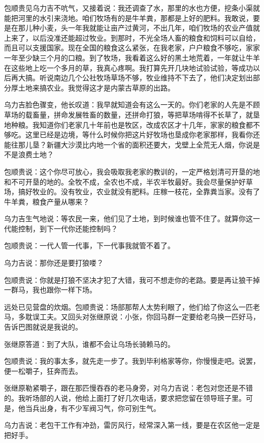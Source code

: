 \par 包顺贵见乌力吉不吭气，又接着说：我还调查了水，那里的水也方便，挖条小渠就能把河里的水引来浇地。咱们牧场有的是牛羊粪，那都是上好的肥料。我敢说，要是在那儿种小麦，头一年我就能让亩产过黄河，不出几年，咱们牧场的农业产值就上来了，以后没准还能超过牧业。到那时，不光全场人畜的粮食和饲料可以自给，而且可以支援国家。现在全国的粮食这么紧张，在我老家，户户粮食不够吃，家家一年至少缺三个月的口粮。到了牧场，我看着这么好的黑土地荒着，一年就让牛羊在这些地上吃一个多月的草，我真心疼啊。我打算先开几块地试验试验，等成功以后再大搞。听说南边几个公社牧场草场不够，牧业维持不下去了，他们决定划出部分厚土地来搞农业。我觉得这才是内蒙古草原的出路。
\par 乌力吉脸色骤变，他长叹道：我早就知道会有这么一天的。你们老家的人先是不顾草场的载畜量，拼命发展牲畜的数量，还拼命打狼，等把草场啃得不长草了，就垦地种粮。我知道你们老家几十年前也是牧区，改成农区才十几年，家家的粮食都不够吃。这里已经是边境，等什么时候你把这片好牧场也垦成你老家那样，我看你还能往那儿垦？新疆大沙漠比内地一个省的面积还要大，戈壁上全荒无人烟，你说是不是浪费土地？
\par 包顺贵说：这个你尽可放心，我会吸取我老家的教训的，一定严格划清可开垦的地和不可开垦的地的。全牧不成，全农也不成，半农半牧最好。我会尽量保护好草场，搞好牧业的。没有牧业，农业就没有肥料。庄稼一枝花，全靠粪当家。没有了牛羊粪，粮食产量从哪来？
\par 乌力吉生气地说：等农民一来，他们见了土地，到时候谁也管不住了。就算你这一代能控制，到下一代你还能控制吗？
\par 包顺贵说：一代人管一代事，下一代事我就管不着了。
\par 乌力吉说：那你还是要打狼喽？
\par 包顺贵说：你就是打狼不坚决才犯了大错，我可不想走你的老路。要是再让狼干掉一群马，我也跟你一样下场。
\par 远处已见营盘的炊烟。包顺贵说：场部那帮人太势利眼了，他们给了你这么一匹老马，多耽误工夫。又回头对张继原说：小张，你回马群一定要给老乌换一匹好马，告诉巴图就说是我说的。
\par 张继原答道：到了大队，谁都不会让乌场长骑赖马的。
\par 包顺贵说：我的事太多，就先走一步了。我到毕利格家等你，你慢慢走吧。说罢，便一松嚼子，狂奔而去。
\par 张继原勒紧嚼子，跟在那匹慢吞吞的老马身旁，对乌力吉说：老包对您还是不错的。我听场部的人说，他给上面打了好几次电话，要求把您留在领导班子里。可是，他当兵出身，有不少军阀习气，你可别生气。
\par 乌力吉说：老包干工作有冲劲，雷厉风行，经常深入第一线，要是在农区他一定是把好手。
